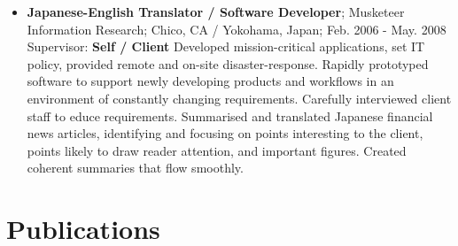 \begin{itemize}
	\item {\bf Japanese-English Translator / Software Developer}; Musketeer Information Research; Chico, CA / Yokohama, Japan; Feb. 2006 - May. 2008
		\subitem Supervisor: {\bf Self / Client }
		\subitem Developed mission-critical applications, set IT policy, provided remote and on-site disaster-response. Rapidly prototyped software to support newly developing products and workflows in an environment of constantly changing requirements. Carefully interviewed client staff to educe requirements. Summarised and translated Japanese financial news articles, identifying and focusing on points interesting to the client, points likely to draw reader attention, and important figures. Created coherent summaries that flow smoothly.

\end{itemize}

\section*{Publications}
\nocite{LUNT201017,Lunt393835}
\nocite{Tabe-Bordbar2020.11.08.373555,canby-etal-2020-university,Khajouei2020.02.07.939264}
\nocite{pmid24603210,MorcosE1293,10.1371/journal.pone.0019729}
\renewcommand{\refname}{\vspace*{-1cm}}


%


